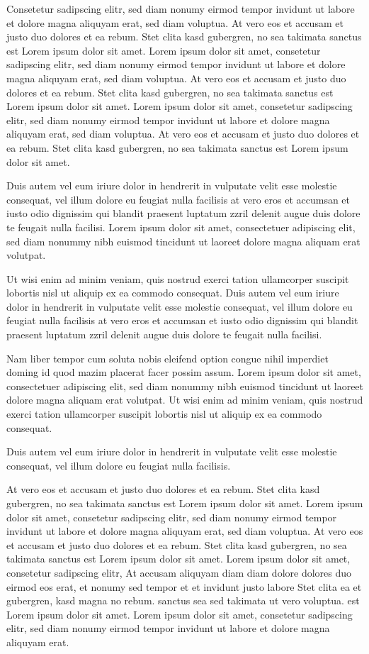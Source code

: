 \documentclass[12pt,a4paper,twoside]{report}
\begin{document}
Consetetur sadipscing elitr, sed diam nonumy eirmod tempor invidunt ut
labore et dolore magna aliquyam erat, sed diam voluptua. At vero eos
et accusam et justo duo dolores et ea rebum. Stet clita kasd
gubergren, no sea takimata sanctus est Lorem ipsum dolor sit amet.
Lorem ipsum dolor sit amet, consetetur sadipscing elitr, sed diam
nonumy eirmod tempor invidunt ut labore et dolore magna aliquyam erat,
sed diam voluptua. At vero eos et accusam et justo duo dolores et ea
rebum. Stet clita kasd gubergren, no sea takimata sanctus est Lorem
ipsum dolor sit amet. Lorem ipsum dolor sit amet, consetetur
sadipscing elitr, sed diam nonumy eirmod tempor invidunt ut labore et
dolore magna aliquyam erat, sed diam voluptua. At vero eos et accusam
et justo duo dolores et ea rebum. Stet clita kasd gubergren, no sea
takimata sanctus est Lorem ipsum dolor sit amet.

Duis autem vel eum iriure dolor in hendrerit in vulputate velit esse
molestie consequat, vel illum dolore eu feugiat nulla facilisis at
vero eros et accumsan et iusto odio dignissim qui blandit praesent
luptatum zzril delenit augue duis dolore te feugait nulla facilisi.
Lorem ipsum dolor sit amet, consectetuer adipiscing elit, sed diam
nonummy nibh euismod tincidunt ut laoreet dolore magna aliquam erat
volutpat.

Ut wisi enim ad minim veniam, quis nostrud exerci tation ullamcorper
suscipit lobortis nisl ut aliquip ex ea commodo consequat. Duis autem
vel eum iriure dolor in hendrerit in vulputate velit esse molestie
consequat, vel illum dolore eu feugiat nulla facilisis at vero eros et
accumsan et iusto odio dignissim qui blandit praesent luptatum zzril
delenit augue duis dolore te feugait nulla facilisi.

Nam liber tempor cum soluta nobis eleifend option congue nihil
imperdiet doming id quod mazim placerat facer possim assum. Lorem
ipsum dolor sit amet, consectetuer adipiscing elit, sed diam nonummy
nibh euismod tincidunt ut laoreet dolore magna aliquam erat volutpat.
Ut wisi enim ad minim veniam, quis nostrud exerci tation ullamcorper
suscipit lobortis nisl ut aliquip ex ea commodo consequat.

Duis autem vel eum iriure dolor in hendrerit in vulputate velit esse
molestie consequat, vel illum dolore eu feugiat nulla facilisis.

At vero eos et accusam et justo duo dolores et ea rebum. Stet clita
kasd gubergren, no sea takimata sanctus est Lorem ipsum dolor sit
amet. Lorem ipsum dolor sit amet, consetetur sadipscing elitr, sed
diam nonumy eirmod tempor invidunt ut labore et dolore magna aliquyam
erat, sed diam voluptua. At vero eos et accusam et justo duo dolores
et ea rebum. Stet clita kasd gubergren, no sea takimata sanctus est
Lorem ipsum dolor sit amet. Lorem ipsum dolor sit amet, consetetur
sadipscing elitr, At accusam aliquyam diam diam dolore dolores duo
eirmod eos erat, et nonumy sed tempor et et invidunt justo labore Stet
clita ea et gubergren, kasd magna no rebum. sanctus sea sed takimata
ut vero voluptua. est Lorem ipsum dolor sit amet. Lorem ipsum dolor
sit amet, consetetur sadipscing elitr, sed diam nonumy eirmod tempor
invidunt ut labore et dolore magna aliquyam erat.
\end{document}
